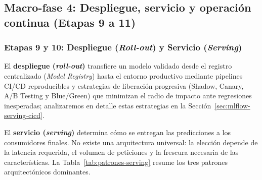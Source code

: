 \subsection{Macro-fase 4: Despliegue, servicio y operación continua (Etapas 9 a 11)}

\subsubsection{Etapas 9 y 10: Despliegue (\textit{Roll-out}) y Servicio (\textit{Serving})}

El \textbf{despliegue (\textit{roll-out})} transfiere un modelo validado desde el registro centralizado (\textit{Model Registry}) hasta el entorno productivo mediante pipelines CI/CD reproducibles y estrategias de liberación progresiva (Shadow, Canary, A/B Testing y Blue/Green) que minimizan el radio de impacto ante regresiones inesperadas; analizaremos en detalle estas estrategias en la Sección~\ref{sec:mlflow-serving-cicd}.

El \textbf{servicio (\textit{serving})} determina cómo se entregan las predicciones a los consumidores finales. No existe una arquitectura universal: la elección depende de la latencia requerida, el volumen de peticiones y la frescura necesaria de las características. La Tabla~\ref{tab:patrones-serving} resume los tres patrones arquitectónicos dominantes.

